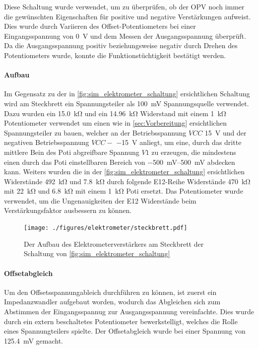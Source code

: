 \documentclass[12pt,english,ngerman]{scrartcl}
\begin{document}
Diese Schaltung wurde verwendet, um zu überprüfen, ob der OPV noch immer die
gewünschten Eigenschaften für positive und negative Verstärkungen aufweist. Dies
wurde durch Variieren des Offset-Potentiometers bei einer Eingangsspannung von \SI{0}{\volt} und dem
Messen der Ausgangsspannung überprüft. Da die Ausgangsspannung positiv beziehungsweise negativ durch 
Drehen des Potentiometers wurde, konnte die Funktionstüchtigkeit bestätigt werden.

\paragraph{Aufbau}
Im Gegensatz zu der in \autoref{fig:sim_elektrometer_schaltung} ersichtlichen
Schaltung wird am Steckbrett ein Spannungsteiler als \SI{100}{mV}
Spannungsquelle verwendet. Dazu wurden ein \SI{15.0}{\kilo\ohm} und ein
\SI{14.96}{\kilo\ohm} Widerstand mit einem \SI{1}{\kilo\ohm} Potentiometer verwendet um einen wie in
\autoref{sec:Vorbereitung} ersichtlichen Spannungsteiler zu bauen, welcher
an der Betriebsspannung $VCC$ \SI{+15}{\volt} und der negativen
Betriebsspannung $VCC-$ \SI{-15}{\volt} anliegt, um eine, durch das dritte
mittlere Bein des Poti abgreifbare Spannung $V1$ zu erzeugen, die
mindestens einen durch das Poti einstellbaren Bereich von
\SIrange{-500}{500}{\milli\volt} abdecken kann. Weiters wurden die in der
\autoref{fig:sim_elektrometer_schaltung} ersichtlichen Widerstände
\SI{492}{\kilo\ohm} und \SI{7.8}{\kilo\ohm} durch folgende E12-Reihe
Widerstände \SI{470}{\kilo\ohm} mit \SI{22}{\kilo\ohm} und \SI{6.8}{\kilo\ohm}
mit einem \SI{1}{\kilo\ohm} Poti ersetzt. Das Potentiometer wurde verwendet, um
die Ungenauigkeiten der E12 Widerstände beim Verstärkungsfaktor ausbessern zu
können.

\begin{figure}[H]
  \centering
    \texttt{[image: ./figures/elektrometer/steckbrett.pdf]}
  \caption{Der Aufbau des Elektrometerverstärkers am Steckbrett der Schaltung von
  \autoref{fig:sim_elektrometer_schaltung}}
  \label{fig:ver_elektromete_aufbau}
\end{figure}

\paragraph{Offsetabgleich}\label{sec:offsetabgleich}
Um den Offsetsspannungableich durchführen zu können, ist zuerst ein
Impedanzwandler aufgebaut worden, wodurch das Abgleichen sich zum Abstimmen
der Eingangsspannug zur Ausgangsspannung vereinfachte. Dies wurde durch ein
extern beschaltetes Potentiometer bewerkstelligt, welches die Rolle eines
Spannungteilers spielte. Der Offsetabgleich wurde bei einer Spannung von
\SI{125.4}{\milli\volt} gemacht.
\end{document}
